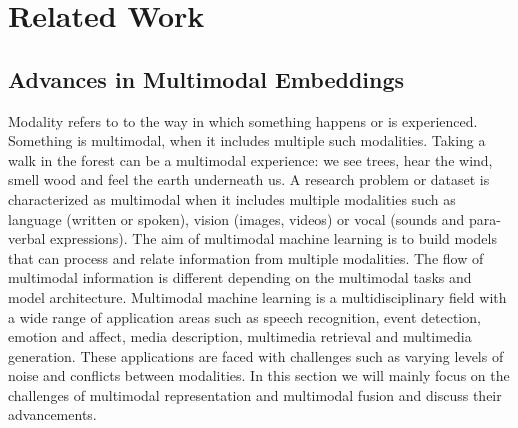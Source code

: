 \documentclass{article}
\newcommand{\todo}[1]{\textbf{\textcolor{Red}{(TODO: #1)}}}
\begin{document}

\section{Related Work}
\subsection{Advances in Multimodal Embeddings} \label{subsection:embeds}
Modality refers to to the way in which something happens or is experienced. Something is multimodal, when it includes multiple such modalities. Taking a walk in the forest can be a multimodal experience: we see trees, hear the wind, smell wood and feel the earth underneath us. A research problem or dataset is characterized as multimodal when it includes multiple modalities such as language (written or spoken), vision (images, videos) or vocal (sounds and para-verbal expressions). The aim of multimodal machine learning is to build models that can process and relate information from multiple modalities. The flow of multimodal information is different depending on the multimodal tasks and model architecture. Multimodal machine learning is a multidisciplinary field with a wide range of application areas such as speech recognition, event detection, emotion and affect, media description, multimedia retrieval and multimedia generation. These applications are faced with challenges such as varying levels of noise and conflicts between modalities. In this section we will mainly focus on the challenges of multimodal representation and multimodal fusion and discuss their advancements.
\end{document}
